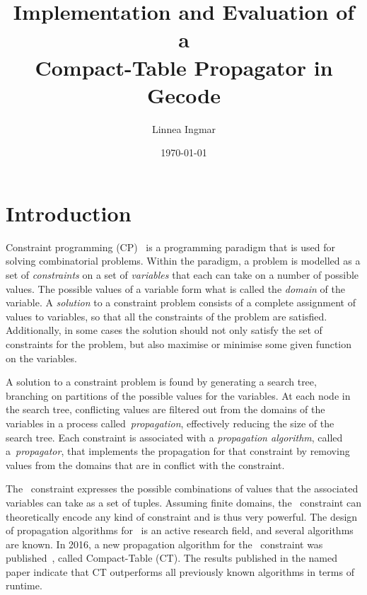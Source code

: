 \documentclass[a4paper,11pt]{article}
\title{\textbf{Implementation and Evaluation of a\\
    Compact-Table Propagator in Gecode
  }
}
\author{Linnea Ingmar} %
\date{\today}
\newcommand{\Table}{\Constraint{Table}}
\newcommand{\CTpaper}[0]{DBLP:conf/cp/DemeulenaereHLP16}
\numberwithin{equation}{section}
\begin{document}
\maketitle

\tableofcontents

\newpage

\section{Introduction}
\label{intro}


Constraint programming (CP)~\cite{Apt:constraintsBook}
is a programming paradigm that is used for solving
combinatorial problems. Within the paradigm, a problem is
modelled as a set of \emph{constraints} on a
set of \emph{variables} that each can take on a number of
possible values. The possible values of 
a variable form what is called the \emph{domain} of the variable.
A \emph{solution} to a constraint problem consists of a complete assignment
of values to variables, so that all the constraints of the problem
are satisfied. Additionally, in some cases the solution should not only
satisfy the set of constraints for the
problem, but also maximise or minimise some given function on the variables.


A solution to a constraint problem is found by generating a search
tree, branching on partitions of the possible values for the variables. 
At each node in the search tree, conflicting values are filtered out
from the domains of the variables in a process called~\emph{propagation},
effectively reducing the size of the search tree.
Each constraint is associated with a \emph{propagation algorithm},
called a~\emph{propagator},
that implements the propagation for that constraint by removing
values from the domains that are in conflict with the constraint.

The \Table~constraint expresses the possible combinations of values
that the associated variables can take as a set of tuples.
Assuming finite domains, the \Table~constraint can theoretically
encode any kind of constraint and is thus very powerful. 
The design of propagation algorithms for \Table~is an active research field,
and several algorithms are known. In 2016, a new propagation algorithm for the
\Table~constraint was published~\cite{\CTpaper}, called Compact-Table (CT).
The results published in the named paper indicate that CT outperforms all previously
known algorithms in terms of runtime.
\end{document}
